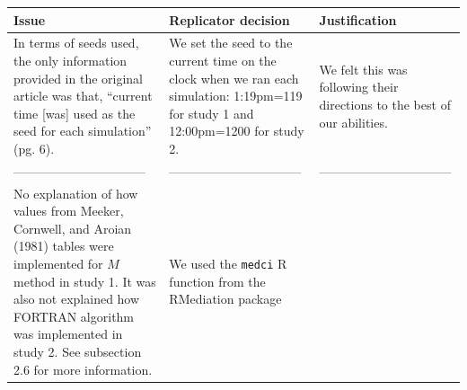 \documentclass[10,a4paperpaper,]{article}
\begin{document}
\begin{longtable}[]{@{}lll@{}}
\toprule
\begin{minipage}[b]{0.30\columnwidth}\raggedright\strut
Issue\strut
\end{minipage} & \begin{minipage}[b]{0.30\columnwidth}\raggedright\strut
Replicator decision\strut
\end{minipage} & \begin{minipage}[b]{0.30\columnwidth}\raggedright\strut
Justification\strut
\end{minipage}\tabularnewline
\midrule
\endhead
\begin{minipage}[t]{0.30\columnwidth}\raggedright\strut
In terms of seeds used, the only information provided in the original
article was that, ``current time {[}was{]} used as the seed for each
simulation'' (pg. 6).\strut
\end{minipage} & \begin{minipage}[t]{0.30\columnwidth}\raggedright\strut
We set the seed to the current time on the clock when we ran each
simulation: 1:19pm=119 for study 1 and 12:00pm=1200 for study 2.\strut
\end{minipage} & \begin{minipage}[t]{0.30\columnwidth}\raggedright\strut
We felt this was following their directions to the best of our
abilities.\strut
\end{minipage}\tabularnewline
\begin{minipage}[t]{0.30\columnwidth}\raggedright\strut
--------------------------------\strut
\end{minipage} & \begin{minipage}[t]{0.30\columnwidth}\raggedright\strut
--------------------------------\strut
\end{minipage} & \begin{minipage}[t]{0.30\columnwidth}\raggedright\strut
--------------------------------\strut
\end{minipage}\tabularnewline
\begin{minipage}[t]{0.30\columnwidth}\raggedright\strut
No explanation of how values from Meeker, Cornwell, and Aroian (1981)
tables were implemented for \(M\) method in study 1. It was also not
explained how FORTRAN algorithm was implemented in study 2. See
subsection 2.6 for more information.\strut
\end{minipage} & \begin{minipage}[t]{0.30\columnwidth}\raggedright\strut
We used the \texttt{medci} R function from the RMediation package

\end{minipage}
\end{longtable}
\end{document}
